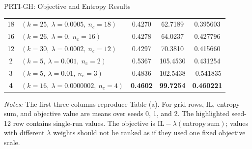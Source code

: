 \documentclass[9pt]{beamer}
\begin{document}
\begin{frame}[t]{PRTI-GH: Objective and Entropy Results}
{\begin{tabular*}{\textwidth}{@{}@{\extracolsep{\fill}}clccc@{}}
        18 & $(k=25,\ \lambda=0.0005,\ n_c=18)$            & 0.4270 & 62.7189  &  0.395603 \\
        16 & $(k=26,\ \lambda=0,\ n_c=16)$                 & 0.4278 & 64.0237  &  0.427796 \\
        12 & $(k=30,\ \lambda=0.0002,\ n_c=12)$            & 0.4297 & 70.3810  &  0.415660 \\
        \midrule
        2 & $(k=5,\ \lambda=0.001,\ n_c=2)$                & 0.5367 & 105.4530 &  0.431254 \\
        3 & $(k=5,\ \lambda=0.01,\ n_c=3)$                 & 0.4836 & 102.5438 & -0.541835 \\
        \midrule
        \rowcolor{lightblue}
        \textbf{4} & $(k=16,\ \lambda=0.0000002,\ n_c=4)$ &
        \textbf{0.4602} & \textbf{99.7254} & \textbf{0.460221} \\
        \bottomrule
    \end{tabular*}
    }

    \vspace{0.15cm}
    \begin{minipage}{0.98\textwidth}
        \tiny
        \textit{Notes:} The first three columns reproduce Table (a). For grid
        rows, IL, entropy sum, and objective value are means over seeds 0, 1,
        and 2. The highlighted seed-12 row contains single-run values. The
        objective is $\mathrm{IL}-\lambda(\mathrm{entropy\ sum})$; values with
        different $\lambda$ weights should not be ranked as if they used one
        fixed objective scale.
    \end{minipage}
\end{frame}
\end{document}
